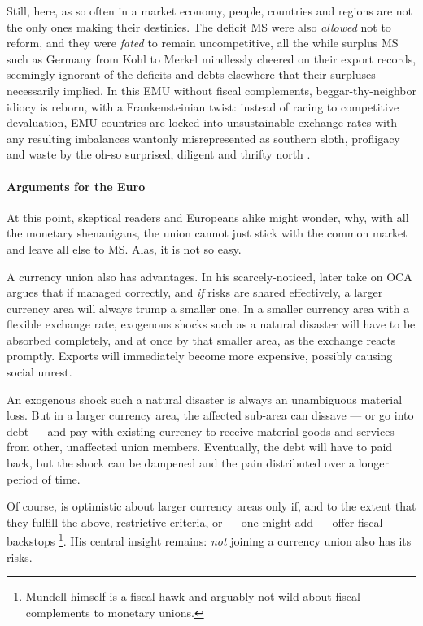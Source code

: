 \documentclass[11pt,a4paper,oneside]{article}
\begin{document}
Still, here, as so often in a market economy, people, countries and regions are not the only ones making their destinies.
The deficit \gls{MS} were also \emph{allowed} not to reform, and they were \emph{fated} to remain uncompetitive, all the while surplus \gls{MS} such as Germany from Kohl to Merkel mindlessly cheered on their export records, seemingly ignorant of the deficits and debts elsewhere that their surpluses necessarily implied.
In this \gls{EMU} without fiscal complements, beggar-thy-neighbor idiocy is reborn, with a Frankensteinian twist:
instead of racing to competitive devaluation, \gls{EMU} countries are locked into unsustainable exchange rates with any resulting imbalances wantonly misrepresented as southern sloth, profligacy and waste by the oh-so surprised, diligent and thrifty north \citep[e.g.][200]{Featherstone2011}.


\paragraph{Arguments for the Euro} At this point, skeptical readers and Europeans alike might wonder, why, with all the monetary shenanigans, the union cannot just stick with the common market and leave all else to \gls{MS}.
Alas, it is not so easy.

A currency union also has advantages.
In his scarcely-noticed, later take on \gls{OCA} \cite{Mundell1972} argues that if managed correctly, and \emph{if} risks are shared effectively, a larger currency area will always trump a smaller one.
In a smaller currency area with a flexible exchange rate, exogenous shocks such as a natural disaster will have to be absorbed completely, and at once by that smaller area, as the exchange reacts promptly.
Exports will immediately become more expensive, possibly causing social unrest.

An exogenous shock such a natural disaster is always an unambiguous material loss.
But in a larger currency area, the affected sub-area can dissave --- or go into debt --- and pay with existing currency to receive material goods and services from other, unaffected union members.
Eventually, the debt will have to paid back, but the shock can be dampened and the pain distributed over a longer period of time.

Of course, \cite{Mundell1972} is optimistic about larger currency areas only if, and to the extent that they fulfill the above, restrictive criteria, or --- one might add --- offer fiscal backstops\ignorespaces
\footnote{
	Mundell himself is a fiscal hawk and arguably not wild about fiscal complements to monetary unions.
}.
His central insight remains:
\emph{not} joining a currency union also has its risks.
\end{document}
